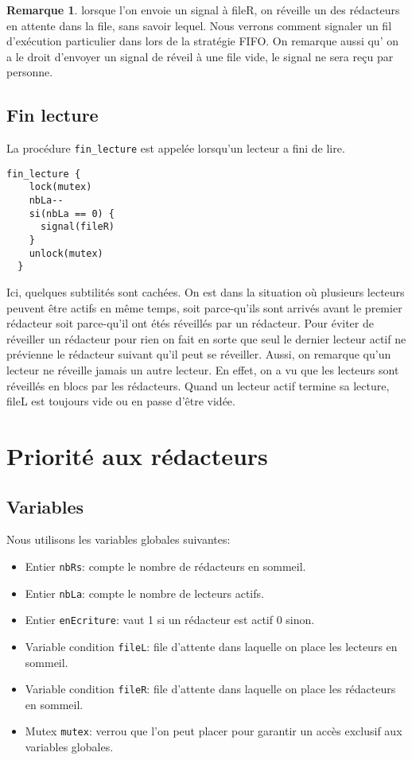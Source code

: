 \documentclass[11pt]{article}
\theoremstyle{definition}
\theoremstyle{definition}
\newtheorem*{myRem}{Remarque}
\begin{document}
\begin{myRem} lorsque l'on envoie un signal à fileR, on réveille un des rédacteurs en attente dans la file, sans savoir lequel.
Nous verrons comment signaler un fil d'exécution particulier dans lors de la stratégie FIFO.
On remarque aussi qu' on a le droit d'envoyer un signal de réveil à une file vide, le signal ne sera reçu par personne.
\end{myRem}

\subsection{Fin lecture}
La procédure \texttt{fin\_lecture} est appelée lorsqu'un lecteur a fini de lire.
\begin{lstlisting}[columns=fixed,basicstyle=\small\ttfamily]
  fin_lecture {
    lock(mutex)
    nbLa--
    si(nbLa == 0) {
      signal(fileR)
    } 
    unlock(mutex)
  }
\end{lstlisting}
Ici, quelques subtilités sont cachées. On est dans la situation où plusieurs lecteurs peuvent
être actifs en même temps, soit parce-qu'ils sont arrivés avant le premier rédacteur soit parce-qu'il ont étés réveillés par un rédacteur. Pour éviter de réveiller un rédacteur pour rien on fait en sorte que seul le dernier lecteur actif ne prévienne le rédacteur suivant qu'il peut se réveiller. Aussi, on remarque qu'un lecteur ne réveille jamais un autre lecteur. En effet, on a vu que les lecteurs sont réveillés en blocs par les rédacteurs. Quand un lecteur actif termine sa lecture, fileL est toujours vide ou en passe d'être vidée.













\section{Priorité aux rédacteurs}

\subsection{Variables}
Nous utilisons les variables globales suivantes:
\begin{itemize}
\item Entier \texttt{nbRs}: compte le nombre de rédacteurs en sommeil.
\item Entier \texttt{nbLa}: compte le nombre de lecteurs actifs.
\item Entier \texttt{enEcriture}: vaut 1 si un rédacteur est actif 0 sinon.
\item Variable condition \texttt{fileL}: file d'attente dans laquelle on place les lecteurs en sommeil.
\item Variable condition \texttt{fileR}: file d'attente dans laquelle on place les rédacteurs en sommeil.
\item Mutex \texttt{mutex}: verrou que l'on peut placer pour garantir un accès exclusif aux variables globales.
\end{itemize}
\end{document}
